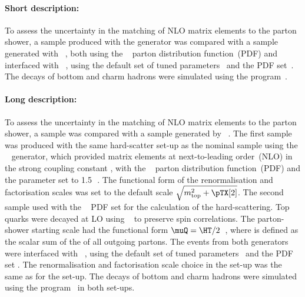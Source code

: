 \paragraph{Short description:}

To assess the uncertainty in the matching of NLO matrix elements to the
parton shower, a sample produced with the
\POWHEGBOX[v2]
generator was compared with a sample generated with \MGNLO[2.6.0]~\cite{Alwall:2014hca}, both using the
\NNPDF[3.0nlo]~\cite{Ball:2014uwa} parton distribution function~(PDF) and interfaced with
\HERWIG[7.13]~\cite{Bahr:2008pv,Bellm:2015jjp}, using the \HERWIG[7.1] default set of
tuned parameters~\cite{Bellm:2015jjp} and the \MMHT[lo] PDF set~\cite{Harland-Lang:2014zoa}.
The decays of bottom and charm hadrons
were simulated using the \EVTGEN[1.6.0] program~\cite{Lange:2001uf}.


\paragraph{Long description:}

To assess the uncertainty in the matching of NLO matrix elements to the parton shower,
a \POWHEG sample was compared with a sample generated by \MGNLO~\cite{Alwall:2014hca}.
The first sample was produced with the same hard-scatter set-up as the nominal sample using the
\POWHEGBOX[v2]~\cite{Frixione:2007nw,Nason:2004rx,Frixione:2007vw,Alioli:2010xd}
generator, which provided matrix elements at next-to-leading
order~(NLO) in the strong coupling constant \alphas, with the
\NNPDF[3.0nlo]~\cite{Ball:2014uwa} parton distribution function~(PDF) and
the \hdamp parameter set to 1.5\,\mtop~\cite{ATL-PHYS-PUB-2016-020}.
The functional form of the renormalisation and factorisation scales was
set to the default scale \(\sqrt{\mtop^{2} + \pTX[2]}\).
The second sample used \MGNLO[2.6.0] with the
\NNPDF[3.0nlo]~\cite{Ball:2014uwa} PDF set for the calculation of the hard-scattering.
Top quarks were decayed at LO using
\MADSPIN~\cite{Frixione:2007zp,Artoisenet:2012st} to preserve spin
correlations. The parton-shower starting
scale had the functional form \(\muQ = \HT/2\)~\cite{ATL-PHYS-PUB-2017-007},
where \HT is defined
as the scalar sum of the \pT of all outgoing partons.
The events from both generators were interfaced with
\HERWIG[7.13]~\cite{Bahr:2008pv,Bellm:2015jjp}, using the \HERWIG[7.1] default set
of tuned parameters~\cite{Bellm:2015jjp} and the \MMHT[lo] PDF set
\cite{Harland-Lang:2014zoa}.
The renormalisation and factorisation scale choice in the \MGNLO set-up was the same as for the
\POWHEGBOX set-up. The decays of bottom and charm hadrons were simulated
using the \EVTGEN[1.6.0] program~\cite{Lange:2001uf} in both set-ups.


